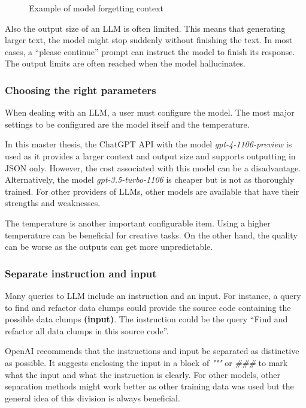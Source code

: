 {\begin{figure}[ht!]
    \centering
    
    \caption{Example of model forgetting context}
    \label{fig:llm_loose_context}
\end{figure}

Also the output size of an \ac{LLM} is often limited. This means that generating larger text, the model might stop suddenly without finishing the text. In most cases, a \enquote{please continue} prompt can instruct the model to finish its response. The output limits are often reached when the model hallucinates. 
\subsubsection{Choosing the right parameters}
When dealing with an \ac{LLM}, a user must configure the model. The most major settings to be configured are the model itself and the temperature.

In this master thesis, the ChatGPT \ac{API} with the model \textit{gpt-4-1106-preview} is used as it provides a larger context  and output size and supports outputting in \ac{JSON} only. However, the cost associated with this model can be a disadvantage. Alternatively, the model \textit{gpt-3.5-turbo-1106} is cheaper but is not as thoroughly trained. For other providers of \acp{LLM}, other models are available that have their strengths and weaknesses.  

The temperature is another important configurable item. Using a higher temperature can be beneficial for creative tasks. On the other hand, the quality can be worse as the outputs can get more unpredictable. 




\subsubsection{Separate instruction and input}
Many queries to \ac{LLM} include an instruction and an input. For instance, a query to find and refactor data clumps could provide the source code containing the possible data clumps \textbf{(input)}. The instruction could be the query \enquote{Find and refactor all data clumps in this source code}. 

OpenAI recommends that the instructions and input be separated as distinctive as possible. It suggests enclosing the input in a block of \textit{"""} or \textit{\#\#\#} to mark what the input and what the instruction is clearly. For other models, other separation methods might work better as other training data was used but the general idea of this division is always beneficial. 

}
